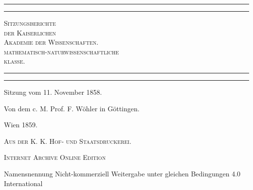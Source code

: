 \documentclass[a4paper, 11pt, oneside]{article}
\begin{document}
\frakfamily
\renewcommand{\contentsname}{
\frakfamily{Inhaltsverzeichnis}
}
\begin{titlepage} %
	\centering %

	
	\rule{\textwidth}{1.6pt}\vspace*{-\baselineskip}\vspace*{2pt} %
	\rule{\textwidth}{0.4pt} %
	
	\vspace{1\baselineskip} %
	
	{\scshape\Huge Sitzungsberichte\\[1.25pt] der Kaiserlichen\\[1.25pt] Akademie der Wissenschaften.\\[1.25pt] mathematisch-naturwissenschaftliche\\[1.25pt] klasse.\\[1.25pt]}
	
	\vspace{1\baselineskip} %

	\rule{\textwidth}{0.4pt}\vspace*{-\baselineskip}\vspace{3.2pt} %
	\rule{\textwidth}{1.6pt} %
	
	\vspace{1\baselineskip} %
	
	
	{\LARGE Sitzung vom 11. November 1858.} %
	
	\vspace*{1\baselineskip} %
	
    {\LARGE Von dem c. M. Prof. F. Wöhler in Göttingen.} %
    
    \vspace*{\fill}

	\vspace{1\baselineskip}

	{\Large Wien 1859.}
	
	{\Large\scshape{Aus der K. K. Hof- und Staatsdruckerei.}}
	
	\vspace{0.5\baselineskip} %

    \Large\scshape Internet Archive Online Edition  %
	
	{\Large Namensnennung Nicht-kommerziell Weitergabe unter gleichen Bedingungen 4.0 International} %
\end{titlepage}
\end{document}
